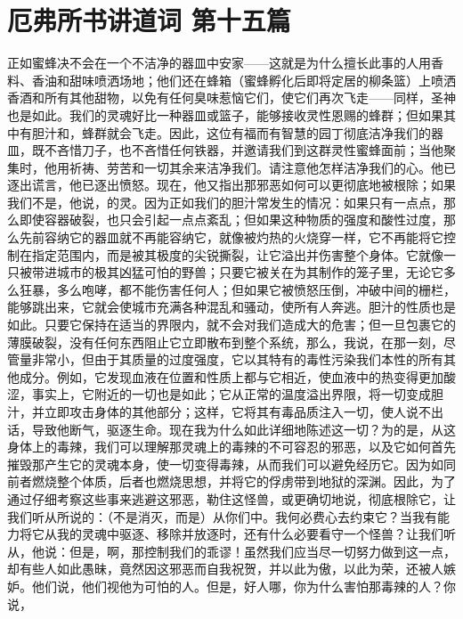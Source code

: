 
\section{厄弗所书讲道词 第十五篇}

\par

\par

正如蜜蜂决不会在一个不洁净的器皿中安家——这就是为什么擅长此事的人用香料、香油和甜味喷洒场地；他们还在蜂箱（蜜蜂孵化后即将定居的柳条篮）上喷洒香酒和所有其他甜物，以免有任何臭味惹恼它们，使它们再次飞走——同样，圣神也是如此。我们的灵魂好比一种器皿或篮子，能够接收灵性恩赐的蜂群；但如果其中有胆汁和，蜂群就会飞走。因此，这位有福而有智慧的园丁彻底洁净我们的器皿，既不吝惜刀子，也不吝惜任何铁器，并邀请我们到这群灵性蜜蜂面前；当他聚集时，他用祈祷、劳苦和一切其余来洁净我们。请注意他怎样洁净我们的心。他已逐出谎言，他已逐出愤怒。现在，他又指出那邪恶如何可以更彻底地被根除；如果我们不是，他说，的灵。因为正如我们的胆汁常发生的情况：如果只有一点点，那么即使容器破裂，也只会引起一点点紊乱；但如果这种物质的强度和酸性过度，那么先前容纳它的器皿就不再能容纳它，就像被灼热的火烧穿一样，它不再能将它控制在指定范围内，而是被其极度的尖锐撕裂，让它溢出并伤害整个身体。它就像一只被带进城市的极其凶猛可怕的野兽；只要它被关在为其制作的笼子里，无论它多么狂暴，多么咆哮，都不能伤害任何人；但如果它被愤怒压倒，冲破中间的栅栏，能够跳出来，它就会使城市充满各种混乱和骚动，使所有人奔逃。胆汁的性质也是如此。只要它保持在适当的界限内，就不会对我们造成大的危害；但一旦包裹它的薄膜破裂，没有任何东西阻止它立即散布到整个系统，那么，我说，在那一刻，尽管量非常小，但由于其质量的过度强度，它以其特有的毒性污染我们本性的所有其他成分。例如，它发现血液在位置和性质上都与它相近，使血液中的热变得更加酸涩，事实上，它附近的一切也是如此；它从正常的温度溢出界限，将一切变成胆汁，并立即攻击身体的其他部分；这样，它将其有毒品质注入一切，使人说不出话，导致他断气，驱逐生命。现在我为什么如此详细地陈述这一切？为的是，从这身体上的毒辣，我们可以理解那灵魂上的毒辣的不可容忍的邪恶，以及它如何首先摧毁那产生它的灵魂本身，使一切变得毒辣，从而我们可以避免经历它。因为如同前者燃烧整个体质，后者也燃烧思想，并将它的俘虏带到地狱的深渊。因此，为了通过仔细考察这些事来逃避这邪恶，勒住这怪兽，或更确切地说，彻底根除它，让我们听从所说的：（不是消灭，而是）从你们中。我何必费心去约束它？当我有能力将它从我的灵魂中驱逐、移除并放逐时，还有什么必要看守一个怪兽？让我们听从，他说：但是，啊，那控制我们的乖谬！虽然我们应当尽一切努力做到这一点，却有些人如此愚昧，竟然因这邪恶而自我祝贺，并以此为傲，以此为荣，还被人嫉妒。他们说，他们视他为可怕的人。但是，好人哪，你为什么害怕那毒辣的人？你说，